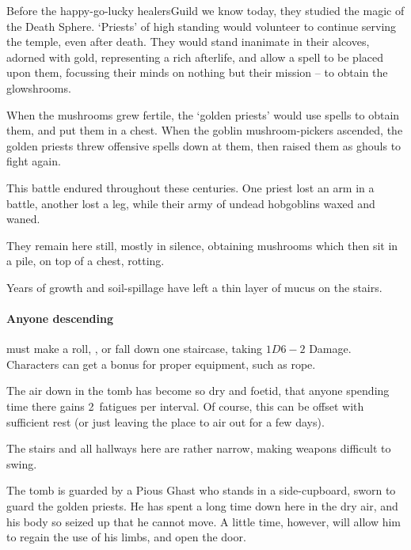\begin{exampletext}
  Before the happy-go-lucky \gls{healersGuild} we know today, they studied the magic of the Death Sphere.
  `Priests' of high standing would volunteer to continue serving the temple, even after death.
  They would stand inanimate in their alcoves, adorned with gold, representing a rich afterlife, and allow a spell to be placed upon them, focussing their minds on nothing but their mission -- to obtain the glowshrooms.

  When the mushrooms grew fertile, the `golden priests' would use spells to obtain them, and put them in a chest.
  When the goblin mushroom-pickers ascended, the golden priests threw offensive spells down at them, then raised them as ghouls to fight again.

  This battle endured throughout these centuries.
  One priest lost an arm in a battle, another lost a leg, while their army of undead hobgoblins waxed and waned.

  They remain here still, mostly in silence, obtaining mushrooms which then sit in a pile, on top of a chest, rotting.
\end{exampletext}


Years of growth and soil-spillage have left a thin layer of mucus on the stairs.

\paragraph{Anyone descending}
must make a  roll, \tn[8], or fall down one staircase, taking $1D6-2$ Damage.
Characters can get a bonus for proper equipment, such as rope.

The air down in the tomb has become so dry and foetid, that anyone spending time there gains 2~\glspl{fatigue} per \gls{interval}.
Of course, this can be offset with sufficient rest (or just leaving the place to air out for a few days).

The stairs and all hallways here are rather narrow, making weapons difficult to swing.%


The tomb is guarded by a Pious Ghast who stands in a side-cupboard, sworn to guard the golden priests.
He has spent a long time down here in the dry air, and his body so seized up that he cannot move.
A little time, however, will allow him to regain the use of his limbs, and open the door.

